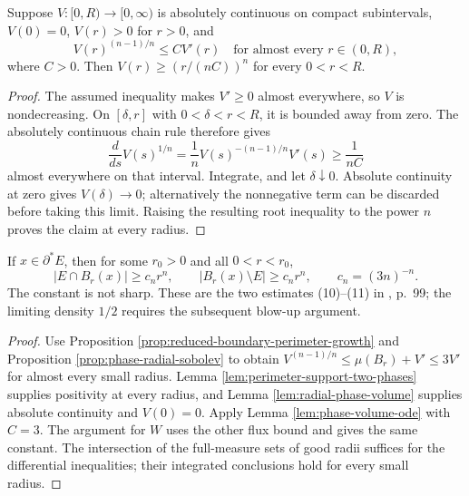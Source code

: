 \begin{lemma}\label{lem:phase-volume-ode}
Suppose $V:[0,R)\to[0,\infty)$ is absolutely continuous on compact subintervals, $V(0)=0$, $V(r)>0$ for $r>0$, and
\[
 V(r)^{(n-1)/n}\leq C V'(r)\quad\text{for almost every }r\in(0,R),
\]
where $C>0$. Then $V(r)\geq(r/(nC))^n$ for every $0<r<R$.
\end{lemma}
\begin{proof}
The assumed inequality makes $V'\geq0$ almost everywhere, so $V$ is nondecreasing. On $[\delta,r]$ with $0<\delta<r<R$, it is bounded away from zero. The absolutely continuous chain rule therefore gives
\[
 \frac{d}{ds}V(s)^{1/n}=\frac1n V(s)^{-(n-1)/n}V'(s)\geq\frac{1}{nC}
\]
almost everywhere on that interval. Integrate, and let $\delta\downarrow0$. Absolute continuity at zero gives $V(\delta)\to0$; alternatively the nonnegative term can be discarded before taking this limit. Raising the resulting root inequality to the power $n$ proves the claim at every radius.
\end{proof}

\begin{theorem}\label{thm:reduced-boundary-two-phase-volume}
If $x\in\partial^*E$, then for some $r_0>0$ and all $0<r<r_0$,
\[
 |E\cap B_r(x)|\geq c_n r^n,\qquad
 |B_r(x)\setminus E|\geq c_n r^n,
 \qquad c_n=(3n)^{-n}.
\]
The constant is not sharp. These are the two estimates (10)--(11) in \cite{Sim18}, p.~99; the limiting density $1/2$ requires the subsequent blow-up argument.
\end{theorem}
\begin{proof}
Use Proposition \ref{prop:reduced-boundary-perimeter-growth} and Proposition \ref{prop:phase-radial-sobolev} to obtain
$V^{(n-1)/n}\leq\mu(B_r)+V'\leq3V'$
for almost every small radius. Lemma \ref{lem:perimeter-support-two-phases} supplies positivity at every radius, and Lemma \ref{lem:radial-phase-volume} supplies absolute continuity and $V(0)=0$. Apply Lemma \ref{lem:phase-volume-ode} with $C=3$. The argument for $W$ uses the other flux bound and gives the same constant. The intersection of the full-measure sets of good radii suffices for the differential inequalities; their integrated conclusions hold for every small radius.
\end{proof}
